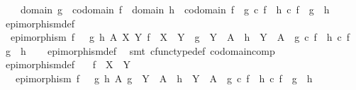 \begin{isabellebody}
\ \ \ \ {\isacharparenleft}{\kern0pt}domain\ g\ {\isacharequal}{\kern0pt}\ codomain\ f\ {\isasymand}\ domain\ h\ {\isacharequal}{\kern0pt}\ codomain\ f{\isacharparenright}{\kern0pt}\ {\isasymlongrightarrow}\ {\isacharparenleft}{\kern0pt}g\ {\isasymcirc}\isactrlsub c\ f\ {\isacharequal}{\kern0pt}\ h\ {\isasymcirc}\isactrlsub c\ f\ {\isasymlongrightarrow}\ g\ {\isacharequal}{\kern0pt}\ h{\isacharparenright}{\kern0pt}{\isacharparenright}{\kern0pt}{\isachardoublequoteclose}\isanewline
\isanewline
{}\isamarkupfalse%
\ epimorphism{\isacharunderscore}{\kern0pt}def{}{\isacharcolon}{\kern0pt}\isanewline
\ \ {\isachardoublequoteopen}epimorphism\ f\ {\isasymlongleftrightarrow}\ {\isacharparenleft}{\kern0pt}{\isasymforall}\ g\ h\ A\ X\ Y{\isachardot}{\kern0pt}\ f\ {\isacharcolon}{\kern0pt}\ X\ {\isasymrightarrow}\ Y\ {\isasymand}\ g\ {\isacharcolon}{\kern0pt}\ Y\ {\isasymrightarrow}\ A\ {\isasymand}\ h\ {\isacharcolon}{\kern0pt}\ Y\ {\isasymrightarrow}\ A\ {\isasymlongrightarrow}\ {\isacharparenleft}{\kern0pt}g\ {\isasymcirc}\isactrlsub c\ f\ {\isacharequal}{\kern0pt}\ h\ {\isasymcirc}\isactrlsub c\ f\ {\isasymlongrightarrow}\ g\ {\isacharequal}{\kern0pt}\ h{\isacharparenright}{\kern0pt}{\isacharparenright}{\kern0pt}{\isachardoublequoteclose}\isanewline
%
\isadelimproof
\ \ %
\endisadelimproof
%
\isatagproof
{}\isamarkupfalse%
\ epimorphism{\isacharunderscore}{\kern0pt}def\ \isamarkupfalse%
\ {\isacharparenleft}{\kern0pt}smt\ cfunc{\isacharunderscore}{\kern0pt}type{\isacharunderscore}{\kern0pt}def\ codomain{\isacharunderscore}{\kern0pt}comp{\isacharparenright}{\kern0pt}%
\endisatagproof
{\isafoldproof}%
%
\isadelimproof
\ \isanewline
%
\endisadelimproof
\isanewline
{}\isamarkupfalse%
\ epimorphism{\isacharunderscore}{\kern0pt}def{}{\isacharcolon}{\kern0pt}\isanewline
\ \ \ {\isachardoublequoteopen}f\ {\isacharcolon}{\kern0pt}\ X\ {\isasymrightarrow}\ Y{\isachardoublequoteclose}\isanewline
\ \ \ {\isachardoublequoteopen}epimorphism\ f\ {\isasymlongleftrightarrow}\ {\isacharparenleft}{\kern0pt}{\isasymforall}\ g\ h\ A{\isachardot}{\kern0pt}\ g\ {\isacharcolon}{\kern0pt}\ Y\ {\isasymrightarrow}\ A\ {\isasymand}\ h\ {\isacharcolon}{\kern0pt}\ Y\ {\isasymrightarrow}\ A\ {\isasymlongrightarrow}\ {\isacharparenleft}{\kern0pt}g\ {\isasymcirc}\isactrlsub c\ f\ {\isacharequal}{\kern0pt}\ h\ {\isasymcirc}\isactrlsub c\ f\ {\isasymlongrightarrow}\ g\ {\isacharequal}{\kern0pt}\ h{\isacharparenright}{\kern0pt}{\isacharparenright}{\kern0pt}{\isachardoublequoteclose}\isanewline

\end{isabellebody}
